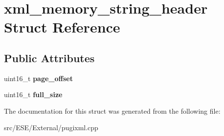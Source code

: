 \hypertarget{structxml__memory__string__header}{\section{xml\-\_\-memory\-\_\-string\-\_\-header Struct Reference}
\label{structxml__memory__string__header}
}
\subsection*{Public Attributes}
\begin{DoxyCompactItemize}
\item 
\hypertarget{structxml__memory__string__header_a0cc274672f1263f73eeb6bf839bf96ee}{uint16\-\_\-t {\bfseries page\-\_\-offset}}\label{structxml__memory__string__header_a0cc274672f1263f73eeb6bf839bf96ee}

\item 
\hypertarget{structxml__memory__string__header_abbb48a709081e6610dffad322499e3f7}{uint16\-\_\-t {\bfseries full\-\_\-size}}\label{structxml__memory__string__header_abbb48a709081e6610dffad322499e3f7}

\end{DoxyCompactItemize}


The documentation for this struct was generated from the following file\-:\begin{DoxyCompactItemize}
\item 
src/\-E\-S\-E/\-External/pugixml.\-cpp\end{DoxyCompactItemize}
